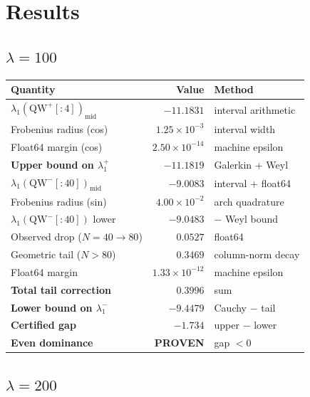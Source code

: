 \documentclass[12pt,a4paper]{article}
\theoremstyle{definition}
\theoremstyle{remark}
\begin{document}
\section{Results}
\label{sec:results}

\subsection{$\lambda = 100$}

\begin{center}
\renewcommand{\arraystretch}{1.2}
\begin{tabular}{lrl}
\toprule
\textbf{Quantity} & \textbf{Value} & \textbf{Method} \\
\midrule
$\lambda_1(\mathrm{QW}^+[{:}4])_{\mathrm{mid}}$ & $-11.1831$ & interval arithmetic \\
Frobenius radius (cos) & $1.25 \times 10^{-3}$ & interval width \\
Float64 margin (cos) & $2.50 \times 10^{-14}$ & machine epsilon \\
\textbf{Upper bound on $\lambda_1^+$} & $\mathbf{-11.1819}$ & Galerkin + Weyl \\
\midrule
$\lambda_1(\mathrm{QW}^-[{:}40])_{\mathrm{mid}}$ & $-9.0083$ & interval + float64 \\
Frobenius radius (sin) & $4.00 \times 10^{-2}$ & arch quadrature \\
$\lambda_1(\mathrm{QW}^-[{:}40])$ lower & $-9.0483$ & $-$ Weyl bound \\
Observed drop ($N{=}40 \to 80$) & $0.0527$ & float64 \\
Geometric tail ($N{>}80$) & $0.3469$ & column-norm decay \\
Float64 margin & $1.33 \times 10^{-12}$ & machine epsilon \\
\textbf{Total tail correction} & $\mathbf{0.3996}$ & sum \\
\textbf{Lower bound on $\lambda_1^-$} & $\mathbf{-9.4479}$ & Cauchy $-$ tail \\
\midrule
\textbf{Certified gap} & $\mathbf{-1.734}$ & upper $-$ lower \\
\textbf{Even dominance} & \textbf{PROVEN} & gap $< 0$ \\
\bottomrule
\end{tabular}
\end{center}

\subsection{$\lambda = 200$}
\end{document}
